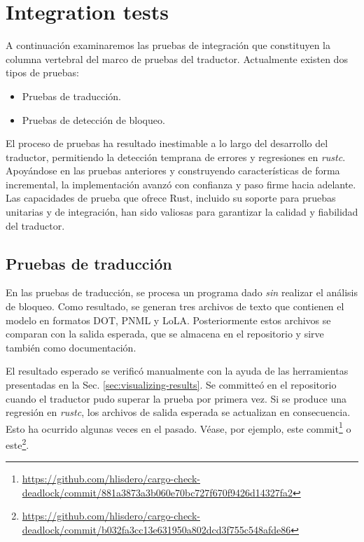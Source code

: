 \section{Integration tests}
\label{sec:integration-tests}

A continuación examinaremos las pruebas de integración que constituyen la columna vertebral
del marco de pruebas del traductor. Actualmente existen dos tipos de pruebas:

\begin{itemize}
  \item Pruebas de traducción.
  \item Pruebas de detección de bloqueo.
\end{itemize}

El proceso de pruebas ha resultado inestimable a lo largo del desarrollo del traductor,
permitiendo la detección temprana de errores y regresiones en \emph{rustc}. Apoyándose en las
pruebas anteriores y construyendo características de forma incremental, la implementación
avanzó con confianza y paso firme hacia adelante. Las capacidades de prueba que ofrece
Rust, incluido su soporte para pruebas unitarias y de integración, han sido valiosas para
garantizar la calidad y fiabilidad del traductor.

\subsection{Pruebas de traducción}

En las pruebas de traducción, se procesa un programa dado \emph{sin} realizar el análisis de bloqueo.
Como resultado, se generan tres archivos de texto que contienen el modelo
en formatos DOT, \acrshort{PNML} y \acrshort{LoLA}.
Posteriormente estos archivos se comparan con la salida esperada, que se
almacena en el repositorio y sirve también como documentación.

El resultado esperado se verificó manualmente
con la ayuda de las herramientas presentadas en la Sec. \ref{sec:visualizing-results}.
Se committeó en el repositorio cuando el traductor pudo superar la prueba por primera
vez. Si se produce una regresión en \emph{rustc}, los archivos de salida esperada se actualizan en
consecuencia.
Esto ha ocurrido algunas veces en el pasado.
Véase, por ejemplo,
este commit\footnote{\url{https://github.com/hlisdero/cargo-check-deadlock/commit/881a3873a3b060e70bc727f670f9426d14327fa2}}
o este\footnote{\url{https://github.com/hlisdero/cargo-check-deadlock/commit/b032fa3cc13e631950a802dcd3f755c548afde86}}.

